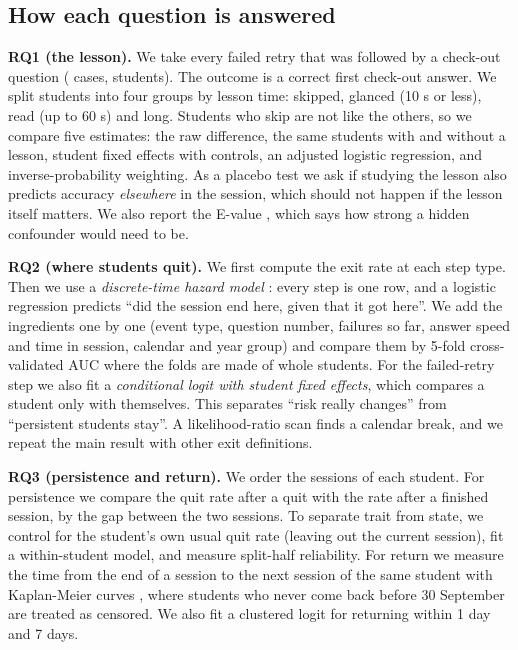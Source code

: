 \documentclass[11pt,a4paper]{article}
\begin{document}
\subsection{How each question is answered}
\textbf{RQ1 (the lesson).} We take every failed retry that was followed by a check-out question (\qOneRoute{} cases, \qOneStudents{} students). The outcome is a correct first check-out answer. We split students into four groups by lesson time: skipped, glanced (10 s or less), read (up to 60 s) and long. Students who skip are not like the others, so we compare five estimates: the raw difference, the same students with and without a lesson, student fixed effects with controls, an adjusted logistic regression, and inverse-probability weighting. As a placebo test we ask if studying the lesson also predicts accuracy \emph{elsewhere} in the session, which should not happen if the lesson itself matters. We also report the E-value \citep{vanderweele2017evalue}, which says how strong a hidden confounder would need to be.

\textbf{RQ2 (where students quit).} We first compute the exit rate at each step type. Then we use a \emph{discrete-time hazard model} \citep{singer1993about}: every step is one row, and a logistic regression predicts ``did the session end here, given that it got here''. We add the ingredients one by one (event type, question number, failures so far, answer speed and time in session, calendar and year group) and compare them by 5-fold cross-validated AUC where the folds are made of whole students. For the failed-retry step we also fit a \emph{conditional logit with student fixed effects}, which compares a student only with themselves. This separates ``risk really changes'' from ``persistent students stay''. A likelihood-ratio scan finds a calendar break, and we repeat the main result with other exit definitions.

\textbf{RQ3 (persistence and return).} We order the sessions of each student. For persistence we compare the quit rate after a quit with the rate after a finished session, by the gap between the two sessions. To separate trait from state, we control for the student's own usual quit rate (leaving out the current session), fit a within-student model, and measure split-half reliability. For return we measure the time from the end of a session to the next session of the same student with Kaplan-Meier curves \citep{kaplan1958nonparametric}, where students who never come back before 30 September are treated as censored. We also fit a clustered logit for returning within 1 day and 7 days.
\end{document}
